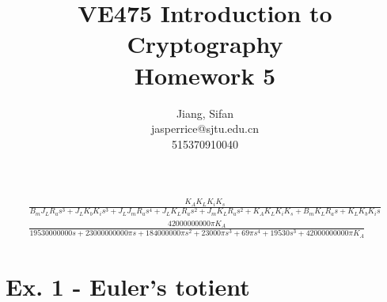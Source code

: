 \documentclass[11pt,a4paper]{article}
\title{
	VE475 Introduction to Cryptography \\
	Homework 5
}
\author{
	Jiang, Sifan\\
	jasperrice@sjtu.edu.cn\\
	515370910040
}
\begin{document}
\maketitle

\begin{tiny}
\begin{align*}
\frac{K_{A} K_{L} K_{i} K_{s}}{B_{m} J_{L} R_{a} s^3+J_{L} K_{b} K_{i} s^3+J_{L} J_{m} R_{a} s^4+J_{L} K_{L} R_{a} s^2+J_{m} K_{L} R_{a} s^2+K_{A} K_{L} K_{i} K_{s}+B_{m} K_{L} R_{a} s+K_{L} K_{b} K_{i} s} \\
\frac{42000000000 \pi  K_{A}}{19530000000 s+23000000000 \pi  s+184000000 \pi  s^2+23000 \pi  s^3+69 \pi  s^4+19530 s^3+42000000000 \pi  K_{A}}
\end{align*}
\end{tiny}


\section*{Ex. 1 - Euler's totient}
\end{document}
